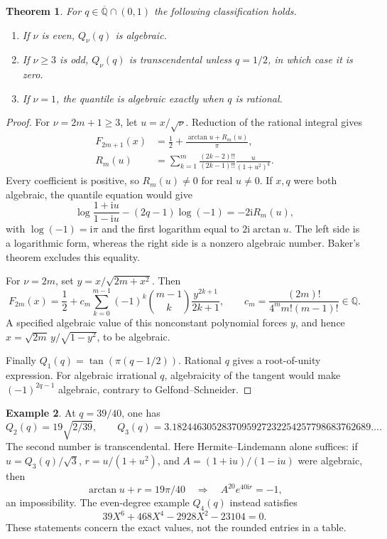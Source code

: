 \documentclass[11pt,a4paper]{article}
\numberwithin{equation}{section}
\newtheorem{theorem}{Theorem}[section]
\theoremstyle{definition}
\newtheorem{example}[theorem]{Example}
\theoremstyle{remark}
\newcommand{\Q}{\mathbb Q}
\newcommand{\Qb}{\overline{\mathbb Q}}
\newcommand{\ii}{\mathrm i}
\begin{document}
\begin{theorem}\label{thm:student}
For $q\in\Qb\cap(0,1)$ the following classification holds.
\begin{enumerate}[label=(\roman*),nosep]
\item If $\nu$ is even, $Q_\nu(q)$ is algebraic.
\item If $\nu\ge3$ is odd, $Q_\nu(q)$ is transcendental unless $q=1/2$,
in which case it is zero.
\item If $\nu=1$, the quantile is algebraic exactly when $q$ is rational.
\end{enumerate}
\end{theorem}
\begin{proof}
For $\nu=2m+1\ge3$, let $u=x/\sqrt\nu$. Reduction of the rational integral
gives
\begin{align}
 F_{2m+1}(x)&=\frac12+\frac{\arctan u+R_m(u)}\pi,\\
 R_m(u)&=\sum_{k=1}^m\frac{(2k-2)!!}{(2k-1)!!}
 \frac{u}{(1+u^2)^k}.
\end{align}
Every coefficient is positive, so $R_m(u)\ne0$ for real $u\ne0$. If $x,q$
were both algebraic, the quantile equation would give
\[
 \log\frac{1+\ii u}{1-\ii u}-(2q-1)\log(-1)=-2\ii R_m(u),
\]
with $\log(-1)=\ii\pi$ and the first logarithm equal to $2\ii\arctan u$.
The left side is a logarithmic form, whereas the right side is a nonzero
algebraic number. Baker's theorem excludes this equality.

For $\nu=2m$, set $y=x/\sqrt{2m+x^2}$. Then
\begin{equation}
 F_{2m}(x)=\frac12+c_m\sum_{k=0}^{m-1}
 (-1)^k\binom{m-1}{k}\frac{y^{2k+1}}{2k+1},\qquad
 c_m=\frac{(2m)!}{4^m m!(m-1)!}\in\Q.
\end{equation}
A specified algebraic value of this nonconstant polynomial forces $y$, and
hence $x=\sqrt{2m}\,y/\sqrt{1-y^2}$, to be algebraic.

Finally $Q_1(q)=\tan(\pi(q-1/2))$. Rational $q$ gives a root-of-unity
expression. For algebraic irrational $q$, algebraicity of the tangent would
make $(-1)^{2q-1}$ algebraic, contrary to Gelfond--Schneider.
\end{proof}

\begin{example}
At $q=39/40$, one has
\[
 Q_2(q)=19\sqrt{2/39},\qquad
 Q_3(q)=3.1824463052837095927232254257798683762689\ldots.
\]
The second number is transcendental. Here Hermite--Lindemann alone suffices:
if $u=Q_3(q)/\sqrt3$, $r=u/(1+u^2)$, and
$A=(1+\ii u)/(1-\ii u)$ were algebraic, then
\[
 \arctan u+r=19\pi/40\quad\Longrightarrow\quad
 A^{20}e^{40\ii r}=-1,
\]
an impossibility. The even-degree example $Q_4(q)$ instead satisfies
\[
 39X^6+468X^4-2928X^2-23104=0.
\]
These statements concern the exact values, not the rounded entries in a
table.
\end{example}
\end{document}
